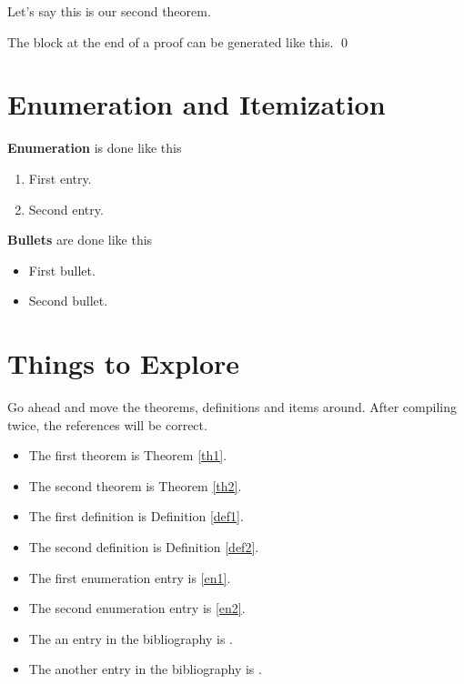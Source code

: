 \begin{theorem}
\label{th2}

Let's say this is our second theorem.

\end{theorem}



The block at the end of a proof can be generated like this. \qed


\section{Enumeration and Itemization}

{\bf Enumeration} is done like this

\begin{enumerate}
\item
\label{en1}
First entry.

\item
\label{en2}
Second entry.

\end{enumerate}


{\bf Bullets} are done like this

\begin{itemize}
\item
First bullet.

\item
Second bullet.

\end{itemize}





\section{Things to Explore}
\label{explore}

Go ahead and move the theorems, definitions and items around.
After compiling twice, the references will be correct.

\begin{itemize}
\item
The first theorem is Theorem \ref{th1}.

\item
The second theorem is Theorem \ref{th2}.

\item
The first definition is Definition \ref{def1}.

\item
The second definition is Definition \ref{def2}.

\item
The first enumeration entry is \ref{en1}.

\item
The second enumeration entry is \ref{en2}.


\item
The an entry in the bibliography is \cite{bib1}.

\item
The another entry in the bibliography is \cite{bib2}.

\end{itemize}


